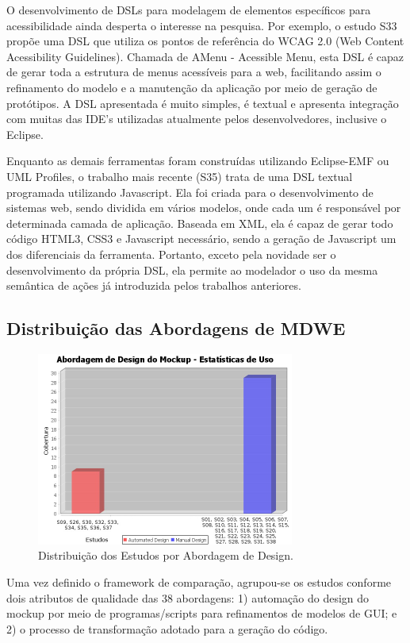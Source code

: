 O desenvolvimento de DSLs para modelagem de elementos específicos para acessibilidade ainda desperta o interesse na pesquisa. Por exemplo, o estudo S33 propõe uma DSL que utiliza os pontos de referência do WCAG 2.0 (Web Content Acessibility Guidelines). Chamada de AMenu - Acessible Menu, esta DSL é capaz de gerar toda a estrutura de menus acessíveis para a web, facilitando assim o refinamento do modelo e a manutenção da aplicação por meio de geração de protótipos. A DSL apresentada é muito simples, é textual e apresenta integração com muitas das IDE’s utilizadas atualmente pelos desenvolvedores, inclusive o Eclipse.


Enquanto as demais ferramentas foram construídas utilizando Eclipse-EMF ou UML Profiles, o trabalho mais recente (S35) trata de uma DSL textual programada utilizando Javascript. Ela foi criada para o desenvolvimento de sistemas web, sendo dividida em vários modelos, onde cada um é responsável por determinada camada de aplicação. Baseada em XML, ela é capaz de gerar todo código HTML3, CSS3 e Javascript necessário, sendo a geração de Javascript um dos diferenciais da ferramenta. Portanto, exceto pela novidade ser o desenvolvimento da própria DSL, ela permite ao modelador o uso da mesma semântica de ações já introduzida pelos trabalhos anteriores.

\subsection{Distribuição das Abordagens de MDWE}

\begin{figure}[t!]
    \centering
    \includegraphics[width=240pt]{./imgs/DesignApproach.jpeg}
    \caption{Distribuição dos Estudos por Abordagem de Design.}
    \label{fig:DesignApproach}
\end{figure}

Uma vez definido o framework de comparação, agrupou-se os estudos conforme dois atributos de qualidade das 38 abordagens: 1) automação do design do mockup por meio de programas/scripts para refinamentos de modelos de GUI; e 2) o processo de transformação adotado para a geração do código. 

